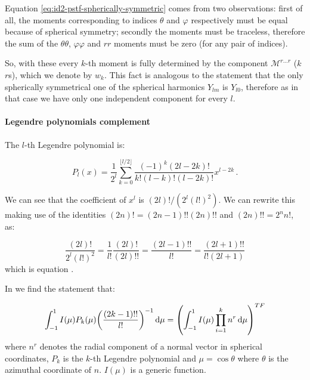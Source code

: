 \documentclass[main.tex]{subfiles}
\begin{document}
Equation \eqref{eq:id2-pstf-spherically-symmetric} comes from two observations:
first of all, the moments corresponding to indices \(\theta\) and \(\varphi\) respectively must be equal because of spherical symmetry; secondly the moments must be traceless, therefore the sum of the \(\theta \theta\), \(\varphi \varphi\) and \(rr\) moments must be zero (for any pair of indices).

So, with these every \(k\)-th moment is fully determined by the component \(\mathscr M ^{r\dots r}\) (\(k\) \(r\)s), which we denote by \(w_k\).
This fact is analogous to the statement that the only spherically symmetrical one of the spherical harmonics \(Y_{lm}\) is \(Y_{l0}\), therefore as in that case we have only one independent component for every \(l\).

\paragraph{Legendre polynomials complement}

The \(l\)-th Legendre polynomial is:

\begin{equation} \label{eq:legendre-polynomials}
    P_{l}(x)=\frac{1}{2^{l}} \sum_{k=0}^{\lfloor l / 2\rfloor} \frac{(-1)^{k}(2 l-2 k) !}{k !(l-k) !(l-2 k) !} x^{l-2 k} \,.
\end{equation}

We can see that the coefficient of \(x^l\) is \((2l)! / (2^l (l!)^2)\). We can rewrite this making use of the identities \((2n)! = (2n-1)!! (2n)!!\) and \((2n)!! = 2^n n!\),  as:

\begin{equation}
    \frac{(2l)!}{2^l (l!)^2} = \frac{1}{l!} \frac{(2l)!}{(2l)!!} = \frac{(2l-1)!!}{l!} = \frac{(2l+1)!!}{l! (2l+1)}
\end{equation}
which is equation \cite[eq. 5.7d]{Thorne:1981feb}.

In \textcite[eqs. 5.6]{Thorne:1981feb} we find the statement that:

\begin{equation} \label{eq:thorne-trace-free-integral-claim}
    \int_{-1}^1 I(\mu) P_k(\mu) \qty(\frac{(2k-1)!!}{l!})^{-1} \dd{\mu} = \qty(\int_{-1}^1  I(\mu) \prod_{i=1}^k n^r \dd{\mu})^{TF}
\end{equation}
where \(n^r\) denotes the radial component of a normal vector in spherical coordinates, \(P_k\) is the \(k\)-th Legendre polynomial and \(\mu = \cos \theta\) where \(\theta\) is the azimuthal coordinate of \(n\). \(I(\mu)\) is a generic function.
\end{document}
